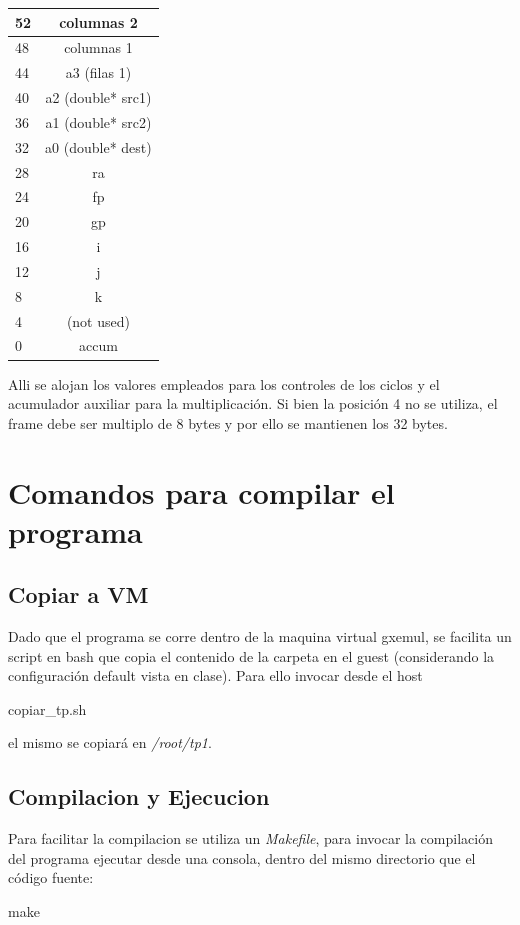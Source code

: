 \documentclass[10pt,a4paper]{article}
\begin{document}
	\begin{center}
			{\footnotesize \begin{tabular}{ |l|c| }

			\hline
				52 & columnas 2 \\ \hline
				48 & columnas 1 \\ \hline	
				44 & a3 (filas 1) \\ \hline
				40 & a2 (double* src1) \\ \hline
				36 & a1 (double* src2) \\ \hline
				32 & a0 (double* dest) \\ \hline
				28 & ra \\ \hline
				24 & fp \\ \hline
				20 & gp \\ \hline
				16 & i \\ \hline
				12 & j \\ \hline
				8 & k \\ \hline
				4 & (not used) \\ \hline
				0 & accum \\ \hline
				
			\end{tabular}}\label{tab:regtension}
	\end{center}

Alli se alojan los valores empleados para los controles de los ciclos y el acumulador auxiliar para la multiplicación. Si bien la posición 4 no se utiliza, el frame debe ser multiplo de 8 bytes y por ello se mantienen los 32 bytes.

\section{Comandos para compilar el programa}
	\subsection{Copiar a VM}
		Dado que el programa se corre dentro de la maquina virtual gxemul, se facilita un script en bash que copia el contenido de la carpeta en el guest (considerando la configuración default vista en clase). Para ello invocar desde el host
		\begin{bash}
		copiar_tp.sh
		\end{bash}
		 el mismo se copiará en \textit{/root/tp1}.

	\subsection{Compilacion y Ejecucion}
		Para facilitar la compilacion se utiliza un \textit{Makefile}, para invocar la compilación del programa ejecutar desde una consola, dentro del mismo directorio que el código fuente:
		\begin{bash}
		make
		\end{bash}
\end{document}
